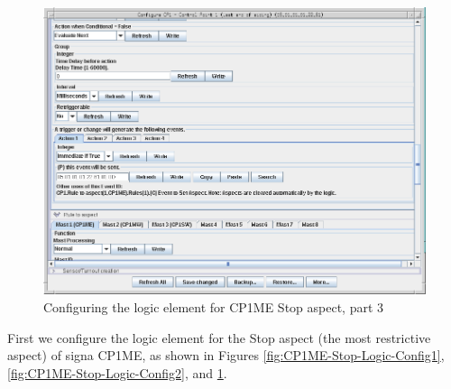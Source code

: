 \begin{figure}[hbpt]\begin{centering}%
\includegraphics[width=5in]{CP1ME-Stop-Logic-Config3.png}
\caption{Configuring the logic element for CP1ME Stop aspect, part 3}
\label{fig:CP1ME-Stop-Logic-Config3}
\end{centering}\end{figure}
First we configure the logic element for the Stop aspect (the most restrictive 
aspect) of signa CP1ME, as shown in Figures 
\ref{fig:CP1ME-Stop-Logic-Config1}, \ref{fig:CP1ME-Stop-Logic-Config2}, and 
\ref{fig:CP1ME-Stop-Logic-Config3}.

